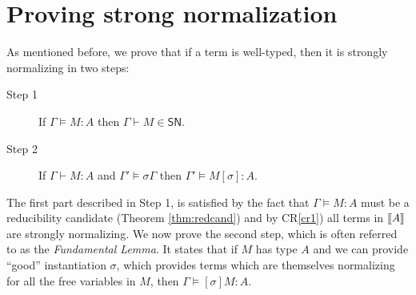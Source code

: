 \documentclass{article}
\newcommand{\SN}{\mathsf{SN}}
\newcommand{\CR}{\textsf{CR}}
\def\lv{\mathopen{{[\kern-0.14em[}}}    %
\def\rv{\mathclose{{]\kern-0.14em]}}}   %
\newcommand{\den}[1]{\lv #1 \rv}
\begin{document}
\section{Proving strong normalization} 
As mentioned before, we prove that if a term is well-typed, then it is strongly normalizing in  two steps:

\begin{description}
\item[Step 1] If $\Gamma \models M : A$ then $\Gamma \vdash M \in \SN$. 
\item[Step 2] If $\Gamma \vdash M : A$ and $\Gamma' \models \sigma \Gamma$ then $\Gamma' \models M[\sigma] : A$.
\end{description}

The first part described in Step 1, is satisfied by the fact that $\Gamma \models M : A$ must be a reducibility candidate (Theorem \ref{thm:redcand}) and  by \CR \ref{cr1})  all terms in $\den{A}$ are strongly normalizing. We now prove the second step, which is often referred to as the \emph{Fundamental Lemma}.
It states that if $M$ has type $A$ and we can provide ``good'' instantiation $\sigma$, which provides terms which are themselves normalizing for all the free variables in $M$, then $\Gamma \models [\sigma]M : A$. 
\end{document}
